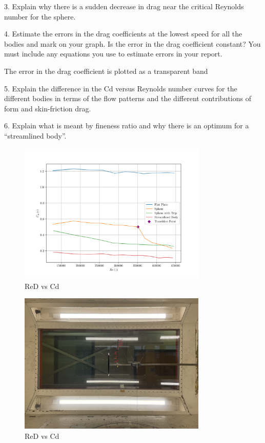 \documentclass[8pt]{article}
\begin{document}
3. Explain why there is a sudden decrease in drag near the critical Reynolds number for the
sphere.

4. Estimate the errors in the drag coefficients at the lowest speed for all the bodies and
mark on your graph. Is the error in the drag coefficient constant? You must include any
equations you use to estimate errors in your report.

The error in the drag coefficient is plotted as a transparent band 

5. Explain the difference in the Cd versus Reynolds number curves for the different bodies in
terms of the flow patterns and the different contributions of form and skin-friction drag.

6. Explain what is meant by fineness ratio and why there is an optimum for a “streamlined
body”.


\begin{figure}[H]
    \centering
    \includegraphics[width=0.8\textwidth]{Re_vs_Cd.png}
    \caption{ReD vs Cd}
    \label{fig:figure1}
\end{figure}

\begin{figure}[H]
    \centering
    \includegraphics[width=0.8\textwidth]{Images_Videos/Plate_8milibar.JPG}
    \caption{ReD vs Cd}
    \label{fig:figure2}
\end{figure}
\end{document}
